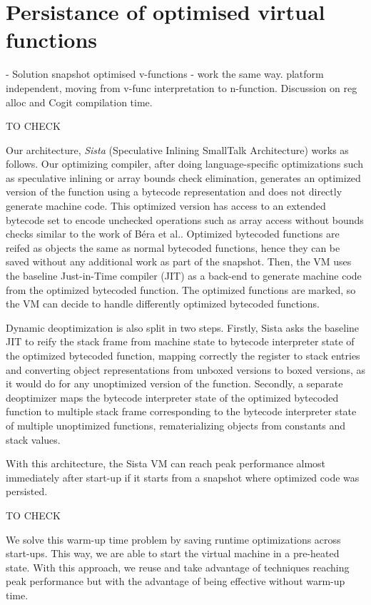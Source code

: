 \documentclass[a4paper,12pt,twoside]{../includes/ThesisStyle}
\begin{document}
\section{Persistance of optimised virtual functions}
\label{sec:persistanceSol}

- Solution snapshot optimised v-functions - work the same way.
platform independent, moving from v-func interpretation to n-function.
Discussion on reg alloc and Cogit compilation time.

TO CHECK


Our architecture, \emph{Sista} (Speculative Inlining SmallTalk Architecture) works as follows. Our optimizing compiler, after doing language-specific optimizations such as speculative inlining or array bounds check elimination, generates an optimized version of the function using a bytecode representation and does not directly generate machine code. This optimized version has access to an extended bytecode set to encode unchecked operations such as array access without bounds checks similar to the work of B\'era et al.\cite{Bera14a}. Optimized bytecoded functions are reifed as objects the same as normal bytecoded functions, hence they can be saved without any additional work as part of the snapshot. Then, the VM uses the baseline Just-in-Time compiler (JIT) as a back-end to generate machine code from the optimized bytecoded function. The optimized functions are marked, so the VM can decide to handle differently optimized bytecoded functions. 

Dynamic deoptimization is also split in two steps. Firstly, Sista asks the baseline JIT to reify the stack frame from machine state to bytecode interpreter state of the optimized bytecoded function, mapping correctly the register to stack entries and converting object representations from unboxed versions to boxed versions, as it would do for any unoptimized version of the function. Secondly, a separate deoptimizer maps the bytecode interpreter state of the optimized bytecoded function to multiple stack frame corresponding to the bytecode interpreter state of multiple unoptimized functions, rematerializing objects from constants and stack values.

With this architecture, the Sista VM can reach peak performance almost immediately after start-up if it starts from a snapshot where optimized code was persisted.

TO CHECK


We solve this warm-up time problem by saving runtime optimizations across start-ups. This way, we are able to start the virtual machine in a pre-heated state. With this approach, we reuse and take advantage of techniques reaching peak performance but with the advantage of being effective without warm-up time. 
\end{document}
